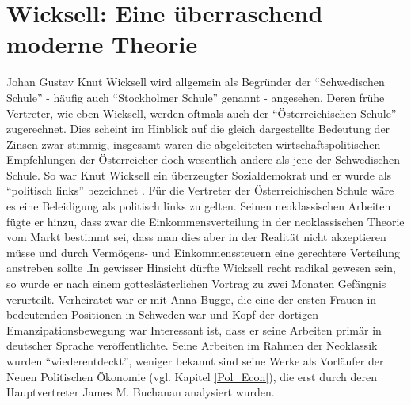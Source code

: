 \section{Wicksell: Eine überraschend moderne Theorie}

Johan Gustav Knut Wicksell wird allgemein als Begründer der "`Schwedischen Schule"' - häufig auch "`Stockholmer Schule"' genannt - angesehen. Deren frühe Vertreter, wie eben Wicksell, werden oftmals auch der "`Österreichischen Schule"' zugerechnet. Dies scheint im Hinblick auf die gleich dargestellte Bedeutung der Zinsen zwar stimmig, insgesamt waren die abgeleiteten wirtschaftspolitischen Empfehlungen der Österreicher doch wesentlich andere als jene der Schwedischen Schule. So war Knut Wicksell ein überzeugter Sozialdemokrat und er wurde als "`politisch links"' bezeichnet \parencite[S. 210, S. 192]{Grossekettler1989}. Für die Vertreter der Österreichischen Schule wäre es eine Beleidigung als politisch links zu gelten. Seinen neoklassischen Arbeiten fügte er hinzu, dass zwar die Einkommensverteilung in der neoklassischen Theorie vom Markt bestimmt sei, dass man dies aber in der Realität nicht akzeptieren müsse und durch Vermögens- und Einkommenssteuern eine gerechtere Verteilung anstreben sollte \parencite[S. 196]{Grossekettler1989}.In gewisser Hinsicht dürfte Wicksell recht radikal gewesen sein, so wurde er nach einem gotteslästerlichen Vortrag zu zwei Monaten Gefängnis verurteilt. Verheiratet war er mit Anna Bugge, die eine der ersten Frauen in bedeutenden Positionen in Schweden war und Kopf der dortigen Emanzipationsbewegung war \parencite[S. 191]{Grossekettler1989} Interessant ist, dass er seine Arbeiten primär in deutscher Sprache veröffentlichte. Seine Arbeiten im Rahmen der Neoklassik wurden "`wiederentdeckt"', weniger bekannt sind seine Werke als Vorläufer der Neuen Politischen Ökonomie (vgl. Kapitel \ref{Pol_Econ}), die erst durch deren Hauptvertreter James M. Buchanan analysiert wurden. 

